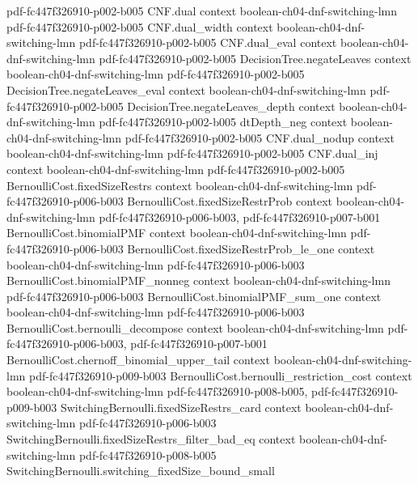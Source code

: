 \begin{theorem}
  {pdf-fc447f326910-p002-b005}
\proofstep
  {CNF.dual}
  {context}
  {boolean-ch04-dnf-switching-lmn}
  {pdf-fc447f326910-p002-b005}
\proofstep
  {CNF.dual_width}
  {context}
  {boolean-ch04-dnf-switching-lmn}
  {pdf-fc447f326910-p002-b005}
\proofstep
  {CNF.dual_eval}
  {context}
  {boolean-ch04-dnf-switching-lmn}
  {pdf-fc447f326910-p002-b005}
\proofstep
  {DecisionTree.negateLeaves}
  {context}
  {boolean-ch04-dnf-switching-lmn}
  {pdf-fc447f326910-p002-b005}
\proofstep
  {DecisionTree.negateLeaves_eval}
  {context}
  {boolean-ch04-dnf-switching-lmn}
  {pdf-fc447f326910-p002-b005}
\proofstep
  {DecisionTree.negateLeaves_depth}
  {context}
  {boolean-ch04-dnf-switching-lmn}
  {pdf-fc447f326910-p002-b005}
\proofstep
  {dtDepth_neg}
  {context}
  {boolean-ch04-dnf-switching-lmn}
  {pdf-fc447f326910-p002-b005}
\proofstep
  {CNF.dual_nodup}
  {context}
  {boolean-ch04-dnf-switching-lmn}
  {pdf-fc447f326910-p002-b005}
\proofstep
  {CNF.dual_inj}
  {context}
  {boolean-ch04-dnf-switching-lmn}
  {pdf-fc447f326910-p002-b005}
\proofstep
  {BernoulliCost.fixedSizeRestrs}
  {context}
  {boolean-ch04-dnf-switching-lmn}
  {pdf-fc447f326910-p006-b003}
\proofstep
  {BernoulliCost.fixedSizeRestrProb}
  {context}
  {boolean-ch04-dnf-switching-lmn}
  {pdf-fc447f326910-p006-b003,
    pdf-fc447f326910-p007-b001}
\proofstep
  {BernoulliCost.binomialPMF}
  {context}
  {boolean-ch04-dnf-switching-lmn}
  {pdf-fc447f326910-p006-b003}
\proofstep
  {BernoulliCost.fixedSizeRestrProb_le_one}
  {context}
  {boolean-ch04-dnf-switching-lmn}
  {pdf-fc447f326910-p006-b003}
\proofstep
  {BernoulliCost.binomialPMF_nonneg}
  {context}
  {boolean-ch04-dnf-switching-lmn}
  {pdf-fc447f326910-p006-b003}
\proofstep
  {BernoulliCost.binomialPMF_sum_one}
  {context}
  {boolean-ch04-dnf-switching-lmn}
  {pdf-fc447f326910-p006-b003}
\proofstep
  {BernoulliCost.bernoulli_decompose}
  {context}
  {boolean-ch04-dnf-switching-lmn}
  {pdf-fc447f326910-p006-b003,
    pdf-fc447f326910-p007-b001}
\proofstep
  {BernoulliCost.chernoff_binomial_upper_tail}
  {context}
  {boolean-ch04-dnf-switching-lmn}
  {pdf-fc447f326910-p009-b003}
\proofstep
  {BernoulliCost.bernoulli_restriction_cost}
  {context}
  {boolean-ch04-dnf-switching-lmn}
  {pdf-fc447f326910-p008-b005,
    pdf-fc447f326910-p009-b003}
\proofstep
  {SwitchingBernoulli.fixedSizeRestrs_card}
  {context}
  {boolean-ch04-dnf-switching-lmn}
  {pdf-fc447f326910-p006-b003}
\proofstep
  {SwitchingBernoulli.fixedSizeRestrs_filter_bad_eq}
  {context}
  {boolean-ch04-dnf-switching-lmn}
  {pdf-fc447f326910-p008-b005}
\proofstep
  {SwitchingBernoulli.switching_fixedSize_bound_small}

\end{theorem}
